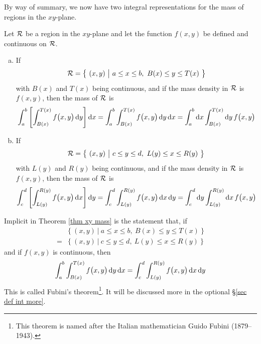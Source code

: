 By way of summary, we now have two integral representations
for the mass of regions in the $xy$-plane.
\begin{theorem}\label{thm xy mass}
Let $\mathcal{R}$ be a region in the $xy$-plane and let the function 
$f(x,y)$ be defined and continuous on $\mathcal{R}$.
\begin{enumerate}[(a)]
\item If
\begin{align*}
\mathcal{R}=\big\{\ (x,y)\ \big|\ a\le x\le b,\ B(x)\le y\le T(x)\ \big\}
\end{align*}
with $B(x)$ and $T(x)$ being continuous, and if the mass density in $\mathcal{R}$ 
is $f(x,y)$, then the mass of $\mathcal{R}$
is
\begin{equation*}
\int_a^b \left[\int_{B(x)}^{T(x)} f\big(x,y\big)\,\mathrm{d}y\right]\mathrm{d}x
=\int_a^b \int_{B(x)}^{T(x)} f\big(x,y\big)\,\mathrm{d}y\,\mathrm{d}x
=\int_a^b \mathrm{d}x \int_{B(x)}^{T(x)} \mathrm{d}y\, f\big(x,y\big)
\end{equation*}

\item If
\begin{equation*}
\mathcal{R} = \big\{\ (x,y)\ \big|\ c\le y\le d,\ L(y)\le x\le R(y)\ \big\}
\end{equation*}
with $L(y)$ and $R(y)$ being continuous, 
and if the mass density in $\mathcal{R}$ is $f(x,y)$, then the mass of $\mathcal{R}$
is
\begin{equation*}
\int_c^d \left[\int_{L(y)}^{R(y)} f\big(x,y\big)\,\mathrm{d}x\right]\mathrm{d}y
=\int_c^d \int_{L(y)}^{R(y)} f\big(x,y\big)\,\mathrm{d}x\,\mathrm{d}y
=\int_c^d \mathrm{d}y \int_{L(y)}^{R(y)} \mathrm{d}x\, f\big(x,y\big)
\end{equation*}
\end{enumerate}
\end{theorem}
\noindent
Implicit in Theorem  \ref{thm xy mass} is the statement that, if
\begin{align*}
&\big\{\ (x,y)\ \big|\ a\le x\le b,\ B(x)\le y\le T(x)\ \big\} \\
   =& \big\{\ (x,y)\ \big|\ c\le y\le d,\ L(y)\le x\le R(y)\ \big\}
\end{align*}
and if $f(x,y)$ is continuous, then
\begin{equation*}
\int_a^b \int_{B(x)}^{T(x)} f\big(x,y\big)\,\mathrm{d}y\,\mathrm{d}x
=\int_c^d \int_{L(y)}^{R(y)} f\big(x,y\big)\,\mathrm{d}x\,\mathrm{d}y
\end{equation*}
This is called Fubini's theorem\footnote{This theorem is named after the Italian mathematician Guido Fubini (1879--1943).
}. It will be discussed more in the
optional \S\ref{sec def int more}. 

